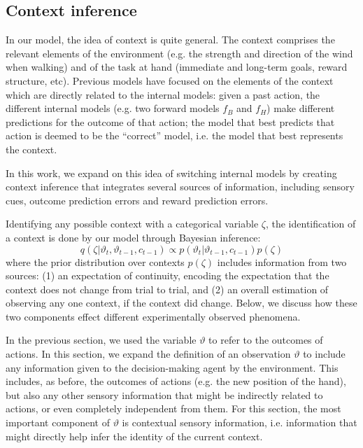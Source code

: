 \documentclass[a4paper,doc,floatsintext,natbib]{apa6}
\begin{document}
\subsection{Context inference}
In our model, the idea of context is quite general. The context comprises the relevant elements of the environment (e.g. the strength and direction of the wind when walking) and of the task at hand (immediate and long-term goals, reward structure, etc). Previous models \cite[e.g.][]{Wolpert_Multiple_1998,Imamizu_Neural_2008,Oh_Minimizing_2019} have focused on the elements of the context which are directly related to the internal models: given a past action, the different internal models (e.g. two forward models $f_B$ and $f_H$) make different predictions for the outcome of that action; the model that best predicts that action is deemed to be the ``correct'' model, i.e. the model that best represents the context.

In this work, we expand on this idea of switching internal models by creating context inference that integrates several sources of information, including sensory cues, outcome prediction errors and reward prediction errors.

Identifying any possible context with a categorical variable $\zeta$, the identification of a context is done by our model through Bayesian inference:
\begin{equation}
q(\zeta | \vartheta_t, \vartheta_{t-1}, c_{t-1}) \propto p(\vartheta_t | \vartheta_{t-1}, c_{t-1})p(\zeta)
\end{equation}
where the prior distribution over contexts $p(\zeta)$ includes information from two sources: (1) an expectation of continuity, encoding the expectation that the context does not change from trial to trial, and (2) an overall estimation of observing any one context, if the context did change. Below, we discuss how these two components effect different experimentally observed phenomena.

In the previous section, we used the variable $\vartheta$ to refer to the outcomes of actions. In this section, we expand the definition of an observation $\vartheta$ to include any information given to the decision-making agent by the environment. This includes, as before, the outcomes of actions (e.g. the new position of the hand), but also any other sensory information that might be indirectly related to actions, or even completely independent from them. For this section, the most important component of $\vartheta$ is contextual sensory information, i.e. information that might directly help infer the identity of the current context.
\end{document}

